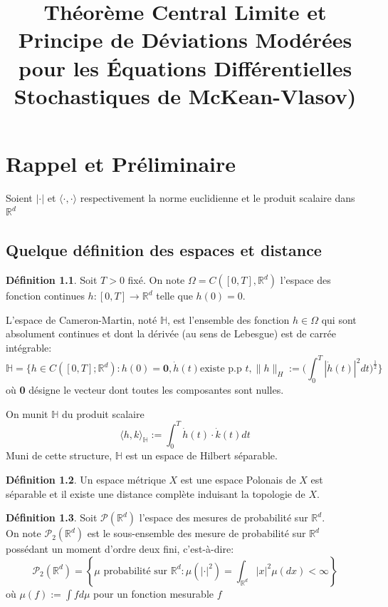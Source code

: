 \documentclass[12pt,a4paper,twoside]{book}%
\title{ \textbf{Théorème Central Limite et Principe de Déviations Modérées pour les Équations Différentielles Stochastiques de McKean-Vlasov)}}
\theoremstyle{definition}
\newtheorem{dfn}{Définition}[section]
\numberwithin{equation}{section}
\begin{document}
	\maketitle
	\newpage
	\tableofcontents
	\newpage
	
	
		\chapter{Rappel et Préliminaire}
Soient \( |\cdot| \) et \( \langle \cdot, \cdot \rangle \) respectivement la norme euclidienne et le produit scalaire dans \( \mathbb{R}^d \)
	\section{Quelque définition des espaces et distance}
	\begin{dfn}
	Soit $T>0$ fixé. On note $\Omega = C([0,T],\mathbb{R}^d)$ l'espace des fonction continues $h : [0,T] \to\mathbb{R}^d$ telle que $h(0) = 0.$
	
	L'espace de Cameron-Martin, noté $\mathbb{H}$, est l'ensemble des fonction $h\in \Omega$ qui sont absolument continues et dont la dérivée (au sens de Lebesgue) est de carrée intégrable:
	\[
	\mathbb{H} = \big\{h\in C([0,T];\mathbb{R}^d):h(0)=\textbf{0},\dot{h}(t) \text{existe p.p }t ,\|h\|_H :=\Big(\int_{0}^{T}|\dot{h}(t)|^2dt\Big)^{\frac{1}{2}} \big\}
	\] où \textbf{0} désigne le vecteur dont toutes les composantes sont nulles.
	
	On munit $\mathbb{H}$ du produit scalaire
	\[
	\langle h,k \rangle_{\mathbb{H}} := \int_{0}^{T}\dot{h}(t)\cdot \dot{k}(t)dt 
	\]
	Muni de cette structure, $\mathbb{H}$ est un espace de Hilbert séparable.
	\end{dfn}
	\begin{dfn}
		Un espace métrique $X$ est une espace Polonais de $X$ est séparable et il existe une distance complète induisant la topologie de $X$.
	\end{dfn}
	\begin{dfn}
		Soit $\mathcal{P}(\mathbb{R}^d)$ l'espace des mesures de probabilité sur $\mathbb{R}^d$.\\
		On note $\mathcal{P}_2(\mathbb{R}^d)$ est le sous-ensemble des mesure de probabilité sur $\mathbb{R}^d$ possédant un moment d'ordre deux fini, c'est-à-dire:
		\[
		\mathcal{P}_2(\mathbb{R}^d) = \left\{ \mu \text{ probabilité sur }\mathbb{R}^d : \mu(|\cdot|^2) = \int_{\mathbb{R}^d} |x|^2\mu(dx)<\infty
		\right\} 
		\]
		où $\mu(f):=\int fd\mu$ pour un fonction mesurable $f$
	\end{dfn}
\end{document}

